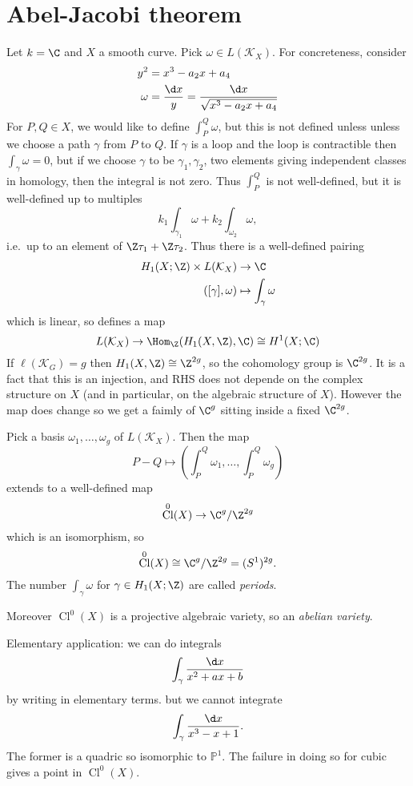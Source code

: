 \documentclass[a4paper]{article}
\DeclareMathOperator{\Cl}{Cl}
\renewcommand*{\P}{\mathbb{P}}
\begin{document}
\section{Abel-Jacobi theorem}

Let \(k = \C\) and \(X\) a smooth curve. Pick \(\omega \in L(\mathcal K_X)\). For concreteness, consider
\begin{align*}
  y^2 &= x^3 - a_2 x + a_4 \\
  \omega &= \frac{\d x}{y} = \frac{\d x}{\sqrt{x^3 - a_2 x + a_4}}
\end{align*}
For \(P, Q \in X\), we would like to define \(\int_P^Q \omega\), but this is not defined unless unless we choose a path \(\gamma\) from \(P\) to \(Q\). If \(\gamma\) is a loop and the loop is contractible then \(\int_\gamma \omega = 0\), but if we choose \(\gamma\) to be \(\gamma_1, \gamma_2\), two elements giving independent classes in homology, then the integral is not zero. Thus \(\int_P^Q\) is not well-defined, but it is well-defined up to multiples
\[
  k_1 \int_{\gamma_1} \omega + k_2 \int_{\omega_2} \omega,
\]
i.e.\ up to an element of \(\Z \tau_1 + \Z \tau_2\). Thus there is a well-defined pairing
\begin{align*}
  H_1(X; \Z) \times L(\mathcal K_X) &\to \C \\
  ([\gamma], \omega) &\mapsto \int_\gamma \omega
\end{align*}
which is linear, so defines a map
\[
  L(\mathcal K_X) \to \Hom_\Z(H_1(X, \Z), \C) \cong H^1(X; \C)
\]
If \(\ell(\mathcal K_G) = g\) then \(H_1(X, \Z) \cong \Z^{2g}\), so the cohomology group is \(\C^{2g}\). It is a fact that this is an injection, and RHS does not depende on the complex structure on \(X\) (and in particular, on the algebraic structure of \(X\)). However the map does change so we get a faimly of \(\C^g\) sitting inside a fixed \(\C^{2g}\).

\begin{theorem}
  Pick a basis \(\omega_1, \dots, \omega_g\) of \(L(\mathcal K_X)\). Then the map
  \[
    P - Q \mapsto (\int_P^Q \omega_1, \dots, \int_P^Q \omega_g)
  \]
  extends to a well-defined map
  \[
    \Cl^0(X) \to \C^{g}/\Z^{2g}
  \]
  which is an isomorphism, so
  \[
    \Cl^0(X) \cong \C^g/\Z^{2g} = (S^1)^{2g}.
  \]
  The number \(\int_\gamma \omega\) for \(\gamma \in H_1(X; \Z)\) are called \emph{periods}.

  Moreover \(\Cl^0(X)\) is a projective algebraic variety, so an \emph{abelian variety}.
\end{theorem}

Elementary application: we can do integrals
\[
  \int_\gamma \frac{\d x}{x^2 + ax + b}
\]
by writing in elementary terms. but we cannot integrate
\[
  \int_\gamma \frac{\d x}{x^3 - x + 1}.
\]
The former is a quadric so isomorphic to \(\P^1\). The failure in doing so for cubic gives a point in \(\Cl^0(X)\).

\printindex
\end{document}
